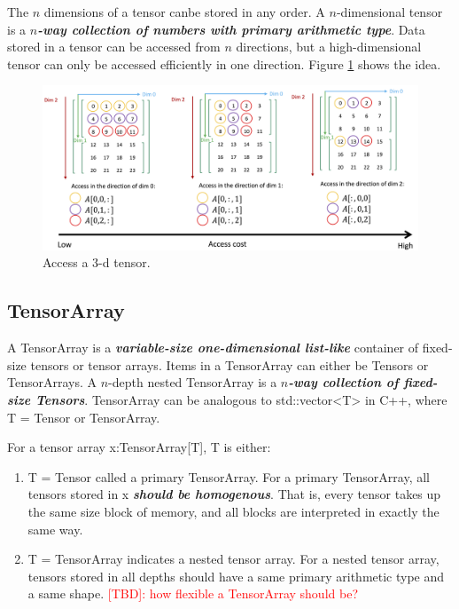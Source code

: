 The $n$ dimensions of a tensor canbe stored in any order. A $n$-dimensional tensor is a \textbf{\textit{$n$-way collection of numbers with primary arithmetic type}}. Data stored in a tensor can be accessed from $n$ directions, but a high-dimensional tensor can only be accessed efficiently in one direction. Figure \ref{fig1} shows the idea.

\begin{figure}[htbp]
\centering
\includegraphics[width=1.\textwidth]{images/tensor.png}
\caption{Access a 3-d tensor.}
\label{fig1}
\end{figure}

\subsection{TensorArray}

A TensorArray is a \textbf{\textit{variable-size one-dimensional list-like}} container of fixed-size tensors or tensor arrays. Items in a TensorArray can either be Tensors or TensorArrays. A $n$-depth nested TensorArray is a \textbf{\textit{$n$-way collection of fixed-size Tensors}}. TensorArray can be analogous to std::vector<T> in C++, where T = Tensor or TensorArray.

For a tensor array x:TensorArray[T], T is either:

\begin{enumerate}
  \item T = Tensor called a primary TensorArray. For a primary TensorArray, all tensors stored in x \textbf{\textit{should be homogenous}}. That is, every tensor takes up the same size block of memory, and all blocks are interpreted in exactly the same way.
  \item T = TensorArray indicates a nested tensor array. For a nested tensor array, tensors stored in all depths should have a same primary arithmetic type and a same shape. \textcolor{red}{[TBD]: how flexible a TensorArray should be?}
\end{enumerate}


